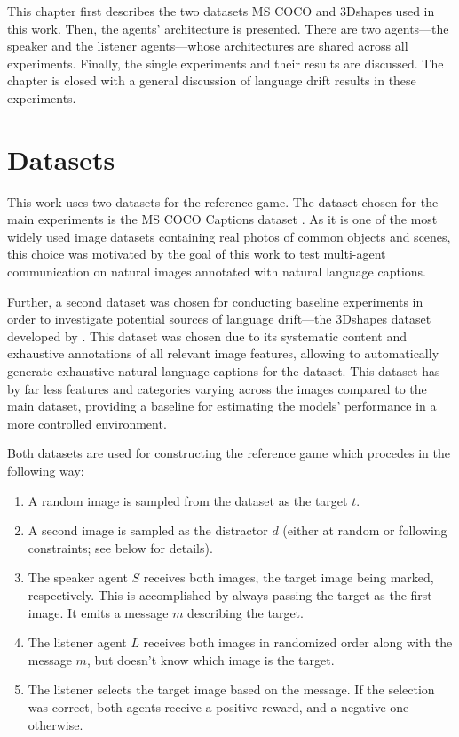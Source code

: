 This chapter first describes the two datasets MS COCO and 3Dshapes used in this work. Then, the agents' architecture is presented. There are two agents---the speaker and the listener agents---whose architectures are shared across all experiments. Finally, the single experiments and their results are discussed. The chapter is closed with a general discussion of language drift results in these experiments.

\section{Datasets}

This work uses two datasets for the reference game. The dataset chosen for the main experiments is the MS COCO Captions dataset \parencite{chen2015microsoft}. As it is one of the most widely used image datasets containing real photos of common objects and scenes, this choice was motivated by the goal of this work to test multi-agent communication on natural images annotated with natural language captions. 

Further, a second dataset was chosen for conducting baseline experiments in order to investigate potential sources of language drift---the 3Dshapes dataset developed by \textcite{burgess20183d}. This dataset was chosen due to its systematic content and exhaustive annotations of all relevant image features, allowing to automatically generate exhaustive natural language captions for the dataset. This dataset has by far less features and categories varying across the images compared to the main dataset, providing a baseline for estimating the models' performance in a more controlled environment.

Both datasets are used for constructing the reference game which procedes in the following way:
\begin{enumerate}
	\item A random image is sampled from the dataset as the target $t$.
	\item A second image is sampled as the distractor $d$ (either at random or following constraints; see below for details).
	\item The speaker agent $S$ receives both images, the target image being marked, respectively. This is accomplished by always passing the target as the first image. It emits a message $m$ describing the target.
	\item The listener agent $L$ receives both images in randomized order along with the message $m$, but doesn't know which image is the target.
	\item The listener selects the target image based on the message. If the selection was correct, both agents receive a positive reward, and a negative one otherwise.	 
\end{enumerate}

